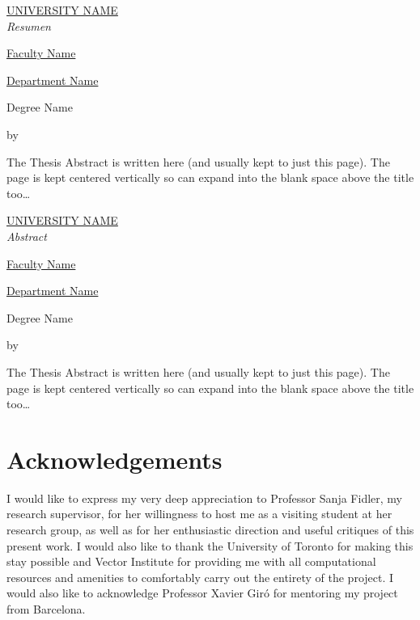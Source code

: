 \clearpage
\thispagestyle{plain}
\null
\vfill
\begin{otherlanguage}{spanish}
  \centering
  \makeatletter
  \MakeUppercase{\href{https://href.com}{University Name}} \\
  \bigskip
  \huge{\textit{Resumen}} \\
  \bigskip
  {\normalsize \href{https://href.com}{Faculty Name} \par}
  {\normalsize \href{https://href.com}{Department Name} \par}
  \bigskip
  {\normalsize Degree Name \par}
  \bigskip
  {\normalsize\bfseries \@title \par}
  \medskip
  {\normalsize by \@author \par}
  \bigskip
  \makeatother
  \small{The Thesis Abstract is written here (and usually kept to just this
    page). The page is kept centered vertically so can expand into the blank space
    above the title too\ldots}
\end{otherlanguage}
\vfill
\null


\clearpage
\thispagestyle{plain}
\null
\vfill
\begin{otherlanguage}{catalan}
  \centering
  \makeatletter
  \MakeUppercase{\href{https://href.com}{University Name}} \\
  \bigskip
  \huge{\textit{Abstract}} \\
  \bigskip
  {\normalsize \href{https://href.com}{Faculty Name} \par}
  {\normalsize \href{https://href.com}{Department Name} \par}
  \bigskip
  {\normalsize Degree Name \par}
  \bigskip
  {\normalsize\bfseries \@title \par}
  \medskip
  {\normalsize by \@author \par}
  \bigskip
  \makeatother
  \small{The Thesis Abstract is written here (and usually kept to just this
    page). The page is kept centered vertically so can expand into the blank space
    above the title too\ldots}
\end{otherlanguage}
\vfill
\null


\chapter*{Acknowledgements}

I would like to express my very deep appreciation to Professor Sanja Fidler, my
research supervisor, for her willingness to host me as a visiting student at her
research group, as well as for her enthusiastic direction and useful critiques
of this present work. I would also like to thank the University of Toronto for
making this stay possible and Vector Institute for providing me with all
computational resources and amenities to comfortably carry out the entirety of
the project. I would also like to acknowledge Professor Xavier Giró for
mentoring my project from Barcelona.

